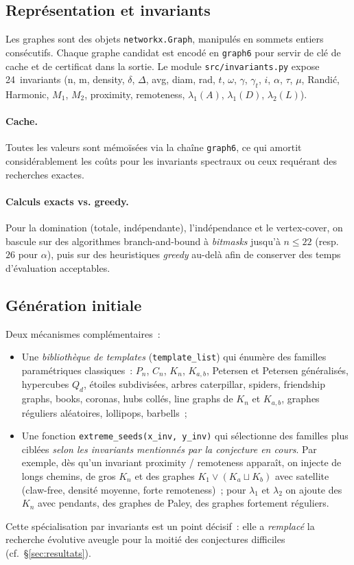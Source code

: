 \documentclass[11pt,a4paper]{article}
\begin{document}
\subsection{Représentation et invariants}

Les graphes sont des objets \texttt{networkx.Graph}, manipulés en sommets
entiers consécutifs. Chaque graphe candidat est encodé en \texttt{graph6} pour
servir de clé de cache et de certificat dans la sortie. Le module
\texttt{src/invariants.py} expose 24~invariants (n, m, density, $\delta$,
$\Delta$, avg, diam, rad, $t$, $\omega$, $\gamma$, $\gamma_t$, $i$, $\alpha$,
$\tau$, $\mu$, Randić, Harmonic, $M_1$, $M_2$, proximity, remoteness,
$\lambda_1(A)$, $\lambda_1(D)$, $\lambda_2(L)$).

\paragraph{Cache.} Toutes les valeurs sont mémoïsées via la chaîne
\texttt{graph6}, ce qui amortit considérablement les coûts pour les
invariants spectraux ou ceux requérant des recherches exactes.

\paragraph{Calculs exacts vs. greedy.}
Pour la domination (totale, indépendante), l'indépendance et le vertex-cover,
on bascule sur des algorithmes branch-and-bound à \emph{bitmasks} jusqu'à
$n \le 22$ (resp. $26$ pour $\alpha$), puis sur des heuristiques \emph{greedy}
au-delà afin de conserver des temps d'évaluation acceptables.

\subsection{Génération initiale}

Deux mécanismes complémentaires~:
\begin{itemize}
  \item Une \emph{bibliothèque de templates} (\texttt{template\_list}) qui
    énumère des familles paramétriques classiques~: $P_n$, $C_n$, $K_n$,
    $K_{a,b}$, Petersen et Petersen généralisés, hypercubes $Q_d$, étoiles
    subdivisées, arbres caterpillar, spiders, friendship graphs, books,
    coronas, hubs collés, line graphs de $K_n$ et $K_{a,b}$, graphes
    réguliers aléatoires, lollipops, barbells~;
  \item Une fonction \texttt{extreme\_seeds(x\_inv, y\_inv)} qui sélectionne
    des familles plus ciblées \emph{selon les invariants mentionnés par la
    conjecture en cours}. Par exemple, dès qu'un invariant proximity /
    remoteness apparaît, on injecte de longs chemins, de gros $K_n$ et des
    graphes \og{}$K_1 \vee (K_a \sqcup K_b)$ avec satellite\fg{} (claw-free,
    densité moyenne, forte remoteness)~; pour $\lambda_1$ et $\lambda_2$ on
    ajoute des $K_n$ avec pendants, des graphes de Paley, des graphes
    fortement réguliers.
\end{itemize}
Cette spécialisation par invariants est un point décisif~: elle a
\emph{remplacé} la recherche évolutive aveugle pour la moitié des conjectures
difficiles (cf.~§\ref{sec:resultats}).
\end{document}
